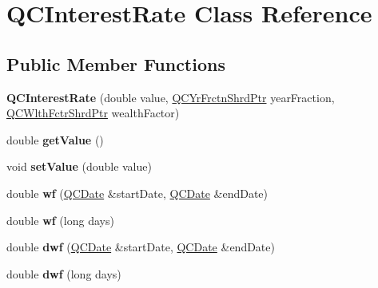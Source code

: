 \hypertarget{class_q_c_interest_rate}{\section{Q\+C\+Interest\+Rate Class Reference}
\label{class_q_c_interest_rate}
}
\subsection*{Public Member Functions}
\begin{DoxyCompactItemize}
\item 
\hypertarget{class_q_c_interest_rate_a10814e414dfe84d64158801cdd0f6e8a}{{\bfseries Q\+C\+Interest\+Rate} (double value, \hyperlink{_q_c_definitions_8h_abcfd4021c75f633fa6d7a4552ced4a38}{Q\+C\+Yr\+Frctn\+Shrd\+Ptr} year\+Fraction, \hyperlink{_q_c_definitions_8h_a2085df477a1aafaad6ed79890607f447}{Q\+C\+Wlth\+Fctr\+Shrd\+Ptr} wealth\+Factor)}\label{class_q_c_interest_rate_a10814e414dfe84d64158801cdd0f6e8a}

\item 
\hypertarget{class_q_c_interest_rate_ae87a6e803d5b0ba27a223dcc1c52ada4}{double {\bfseries get\+Value} ()}\label{class_q_c_interest_rate_ae87a6e803d5b0ba27a223dcc1c52ada4}

\item 
\hypertarget{class_q_c_interest_rate_ab718b93038f3be85b7c0d4cab9d92d8d}{void {\bfseries set\+Value} (double value)}\label{class_q_c_interest_rate_ab718b93038f3be85b7c0d4cab9d92d8d}

\item 
\hypertarget{class_q_c_interest_rate_a1245a1aa2d41304ad9134e06ed7663d3}{double {\bfseries wf} (\hyperlink{class_q_c_date}{Q\+C\+Date} \&start\+Date, \hyperlink{class_q_c_date}{Q\+C\+Date} \&end\+Date)}\label{class_q_c_interest_rate_a1245a1aa2d41304ad9134e06ed7663d3}

\item 
\hypertarget{class_q_c_interest_rate_a0607f8abed935ee8f036f81e3be96223}{double {\bfseries wf} (long days)}\label{class_q_c_interest_rate_a0607f8abed935ee8f036f81e3be96223}

\item 
\hypertarget{class_q_c_interest_rate_ae58c028cc811c1a6a560ed9985a98210}{double {\bfseries dwf} (\hyperlink{class_q_c_date}{Q\+C\+Date} \&start\+Date, \hyperlink{class_q_c_date}{Q\+C\+Date} \&end\+Date)}\label{class_q_c_interest_rate_ae58c028cc811c1a6a560ed9985a98210}

\item 
\hypertarget{class_q_c_interest_rate_a99365541cdc1fdea589f7ded97d861c8}{double {\bfseries dwf} (long days)}\label{class_q_c_interest_rate_a99365541cdc1fdea589f7ded97d861c8}


\end{DoxyCompactItemize}

